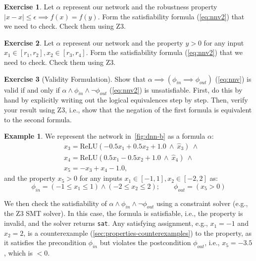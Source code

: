 \documentclass[oneside,11pt,dvipsnames]{book}
\numberwithin{equation}{section}
\theoremstyle{definition}
\newtheorem{example}{Example}[section]
\newtheorem{exercise}{Exercise}[section]
\theoremstyle{remark}
\newcommand{\relu}[1]{\mathrm{ReLU}\left(#1\right)}
\newcommand{\sat}{\texttt{sat}}
\begin{document}
\begin{exercise}\label{ex:prop-neg1}
  Let $\alpha$ represent our network and the robustness property $| x - x | \le \epsilon \implies  f(x) = f(y)$. Form the satisfiability formula (\autoref{eq:nnv2}) that we need to check. Check them using Z3. 
\end{exercise}


\begin{exercise}\label{ex:prop-neg2}
  Let $\alpha$ represent our network and the property $y>0$ for any input $x_1 \in [r_1,r_2], x_2 \in [r_3,r_4]$. Form the satisfiability formula (\autoref{eq:nnv2}) that we need to check. Check them using Z3.
\end{exercise}


\begin{exercise}[Validity Formulation]\label{ex:negation-trick}
Show that $\alpha \implies (\phi_{in} \implies \phi_{out})$ (\autoref{eq:nnv}) is valid if and only if $\alpha \land \phi_{in} \land \neg \phi_{out}$ (\autoref{eq:nnv2}) is unsatisfiable.
First, do this by hand by explicitly writing out the logical equivalences step by step. Then, verify your result using Z3, i.e., show that the negation of the first formula is equivalent to the second formula.
\end{exercise}

\begin{example}\label{ex:dnn-sat}
We represent the network in~\autoref{fig:dnn-b} as a formula $\alpha$:
\begin{align*}
& x_3 = \relu{-0.5x_1 + 0.5x_2 + 1.0 ~\land~ \hat{x}_3} ~\land \\
& x_4 = \relu{0.5x_1 - 0.5x_2 + 1.0  ~\land~ \hat{x}_4} ~\land \\
& x_5 = -x_3 + x_4 - 1.0,
\end{align*}
\noindent and the property $x_5 > 0$ for any inputs $x_1 \in [-1,1], x_2\in[-2,2]$ as:
\begin{equation*}
\phi_{in} = (-1 \le x_1 \le 1) \land (-2 \le x_2 \le 2); \qquad
\phi_{out} = (x_5 > 0)
\end{equation*}

We then check the satisfiability of $\alpha \land \phi_{in} \land \neg \phi_{out}$ using a constraint solver (e.g., the Z3 SMT solver).  In this case, the formula is satisfiable, i.e., the property is invalid, and the solver returns \sat{}.  Any satisfying assignment, e.g., $x_1=-1$ and $x_2=2$, is a counterexample (\autoref{sec:properties-counterexamples}) to the property, as it satisfies the precondition $\phi_{in}$ but violates the postcondition $\phi_{out}$, i.e., $x_5 = -3.5$, which is  $< 0$.

\end{example}
\end{document}
